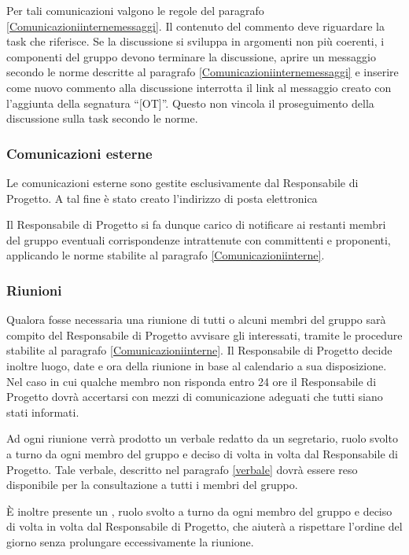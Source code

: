 Per tali comunicazioni valgono le regole del paragrafo \ref{Comunicazioniinternemessaggi}. Il contenuto del commento deve riguardare la task che riferisce. Se la discussione si sviluppa in argomenti non più coerenti, i componenti del gruppo \GroupName{} devono terminare la discussione, aprire un messaggio secondo le norme descritte al paragrafo \ref{Comunicazioniinternemessaggi} e inserire come nuovo commento alla discussione interrotta il link al messaggio creato con l'aggiunta della segnatura ``[OT]''. Questo non vincola il proseguimento della discussione sulla task secondo le norme.

\subsubsection{Comunicazioni esterne}
\label{email}

Le comunicazioni esterne sono gestite esclusivamente dal Responsabile di Progetto. A tal fine è stato creato l'indirizzo di posta elettronica
\begin{center} \GroupEmail{} \end{center}

Il Responsabile di Progetto si fa dunque carico di notificare ai restanti membri del gruppo eventuali corrispondenze
intrattenute con committenti e proponenti, applicando le norme stabilite al paragrafo \ref{Comunicazioniinterne}.


\subsubsection{Riunioni}

Qualora fosse necessaria una riunione di tutti o alcuni membri del gruppo sarà compito del Responsabile di Progetto avvisare gli interessati, tramite le procedure stabilite al paragrafo \ref{Comunicazioniinterne}.
Il Responsabile di Progetto decide inoltre luogo, date e ora della riunione in base al calendario a sua disposizione. Nel caso in cui qualche membro non risponda entro 24 ore il Responsabile di Progetto dovrà accertarsi con mezzi di comunicazione adeguati che tutti siano stati informati.

Ad ogni riunione verrà prodotto un verbale redatto da un segretario, ruolo svolto a turno da ogni membro del gruppo e deciso di volta in volta dal Responsabile di Progetto. Tale verbale, descritto nel paragrafo \ref{verbale} dovrà essere reso disponibile per la consultazione a tutti i membri del gruppo.

È inoltre presente un , ruolo svolto a turno da ogni membro del gruppo e deciso di volta in volta dal Responsabile di Progetto, che aiuterà a rispettare l'ordine del giorno senza prolungare eccessivamente la riunione.


